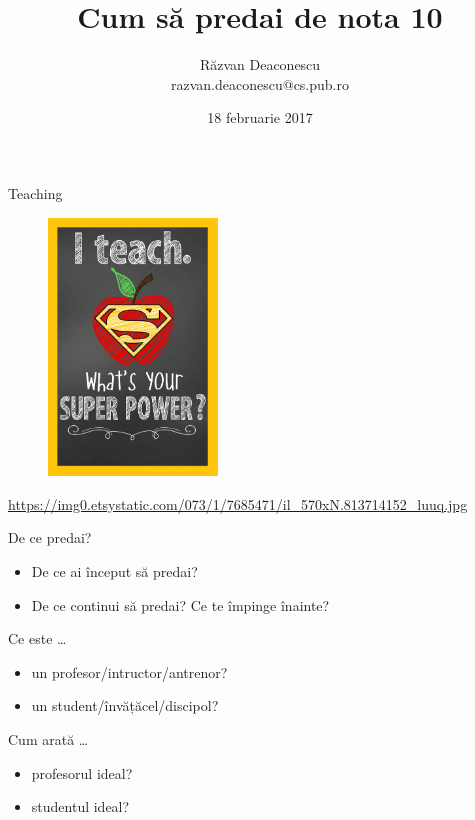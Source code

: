 \documentclass{beamer}
\title[Predare nota 10]{Cum să predai de nota 10}
\institute{Excursie VMXL4, PRECIS 708 și prietenii}
\author[Răzvan Deaconescu]{Răzvan Deaconescu \\
razvan.deaconescu@cs.pub.ro}
\date{18 februarie 2017}
\begin{document}
\frame{\titlepage}

\begin{frame}{Teaching}
  \begin{figure}
    \centering
    \includegraphics[width=0.4\textwidth]{img/super-power.jpg}
  \end{figure}
  \begin{center}
    \scriptsize
    \url{https://img0.etsystatic.com/073/1/7685471/il_570xN.813714152_luuq.jpg}
  \end{center}
\end{frame}

\begin{frame}{De ce predai?}
  \begin{itemize}
    \pause
    \item De ce ai început să predai?
    \pause
    \item De ce continui să predai? Ce te împinge înainte?
  \end{itemize}
\end{frame}

\begin{frame}{Ce este \ldots}
  \begin{itemize}
    \pause
    \item un profesor/intructor/antrenor?
    \pause
    \item un student/învățăcel/discipol?
  \end{itemize}
\end{frame}

\begin{frame}{Cum arată \ldots}
  \begin{itemize}
    \pause
    \item profesorul ideal?
    \pause
    \item studentul ideal?
  \end{itemize}
\end{frame}
\end{document}
